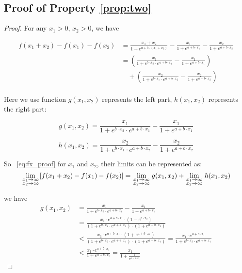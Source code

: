 \subsection{Proof of Property \ref{prop:two}}
\begin{proof}
For any $x_1>0$, $x_2>0$, we have

\begin{equation}
\label{eq:fx_proof}
\begin{aligned}
f(x_1+x_2)-f(x_1)-f(x_2)&=\frac{x_1+x_2}{1+e^{a+b\cdot (x_1+x_2)}}-\frac{x_1}{1+e^{a+b\cdot x_1}}-\frac{x_2}{1+e^{a+b\cdot x_2}}\\
&=(\frac{x_1}{1+e^{b\cdot x_2}\cdot e^{a+b\cdot {x_1}}}-\frac{x_1}{1+e^{a+b\cdot x_1}})\\
&\quad +(\frac{x_2}{1+e^{b\cdot x_1}\cdot e^{a+b\cdot {x_2}}}-\frac{x_2}{1+e^{a+b\cdot x_2}})\\
\end{aligned}
\end{equation}

Here we use function $g(x_1,x_2)$ represents the left part, $h(x_1,x_2)$ represents the right part:

\begin{equation}
\label{eq:gx_func_proof}
g(x_1,x_2)=\frac{x_1}{1+e^{b\cdot x_2}\cdot e^{a+b\cdot {x_1}}}-\frac{x_1}{1+e^{a+b\cdot x_1}}
\end{equation}

\begin{equation}
\label{eq:hx_func_proof}
h(x_1,x_2)=\frac{x_2}{1+e^{b\cdot x_1}\cdot e^{a+b\cdot {x_2}}}-\frac{x_2}{1+e^{a+b\cdot x_2}}
\end{equation}

So ~\eqref{eq:fx_proof} for $x_1$ and $x_2$, their limits can be represented as:
\[
\mathop {\lim }\limits_{\scriptstyle x_1 \to \infty  \hfill \atop  \scriptstyle x_2 \to \infty  \hfill}[f(x_1+x_2)-f(x_1)-f(x_2)]=\mathop {\lim }\limits_{\scriptstyle x_1 \to \infty  \hfill \atop  \scriptstyle x_2 \to \infty  \hfill}g(x_1,x_2)+\mathop {\lim }\limits_{\scriptstyle x_1 \to \infty  \hfill \atop  \scriptstyle x_2 \to \infty  \hfill}h(x_1,x_2)
\]

we have
\[
\begin{aligned}
g(x_1,x_2)&=\frac{x_1}{1+e^{b\cdot x_2}\cdot e^{a+b\cdot {x_1}}}-\frac{x_1}{1+e^{a+b\cdot x_1}}\\
&=\frac{x_1\cdot e^{a+b\cdot x_1}\cdot(1-e^{b\cdot x_2})}{(1+e^{b\cdot x_2}\cdot e^{a+b\cdot x_1})\cdot(1+e^{a+b\cdot x_1})}\\
&<\frac{x_1\cdot e^{a+b\cdot x_1}\cdot(1+e^{a+b\cdot x_1})}{(1+e^{b\cdot x_2}\cdot e^{a+b\cdot x_1})\cdot(1+e^{a+b\cdot x_1})}=\frac{x_1\cdot e^{a+b\cdot x_1}}{1+e^{b\cdot x_2}\cdot e^{a+b\cdot x_1}}\\
&<\frac{x_1\cdot e^{a+b\cdot x_1}}{1+e^{a+b\cdot x_1}}=\frac{x_1}{1+\frac{1}{e^{a+b\cdot x_1}}}
\end{aligned}
\]


\end{proof}

